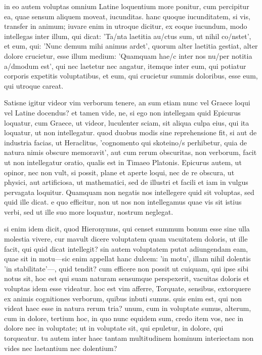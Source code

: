 in eo autem voluptas omnium Latine loquentium more ponitur, cum percipitur ea, quae sensum aliquem moveat, iucunditas. hanc quoque iucunditatem, si vis, transfer in animum; iuvare enim in utroque dicitur, ex eoque iucundum, modo intellegas inter illum, qui dicat: 'Ta/nta laetitia au/ctus sum, ut nihil co/nstet', et eum, qui: 'Nunc demum mihi animus ardet', quorum alter laetitia gestiat, alter dolore crucietur, esse illum medium: 'Quamquam hae/c inter nos nu/per notitia a/dmodum est', qui nec laetetur nec angatur, itemque inter eum, qui potiatur corporis expetitis voluptatibus, et eum, qui crucietur summis doloribus, esse eum, qui utroque careat.

 Satisne igitur videor vim verborum tenere, an sum etiam nunc vel Graece loqui vel Latine docendus? et tamen vide, ne, si ego non intellegam quid Epicurus loquatur, cum Graece, ut videor, luculenter sciam, sit aliqua culpa eius, qui ita loquatur, ut non intellegatur. quod duobus modis sine reprehensione fit, si aut de industria facias, ut Heraclitus, 'cognomento qui skoteino/s perhibetur, quia de natura nimis obscure memoravit', aut cum rerum obscuritas, non verborum, facit ut non intellegatur oratio, qualis est in Timaeo Platonis. Epicurus autem, ut opinor, nec non vult, si possit, plane et aperte loqui, nec de re obscura, ut physici, aut artificiosa, ut mathematici, sed de illustri et facili et iam in vulgus pervagata loquitur. Quamquam non negatis nos intellegere quid sit voluptas, sed quid ille dicat. e quo efficitur, non ut nos non intellegamus quae vis sit istius verbi, sed ut ille suo more loquatur, nostrum neglegat.

 si enim idem dicit, quod Hieronymus, qui censet summum bonum esse sine ulla molestia vivere, cur mavult dicere voluptatem quam vacuitatem doloris, ut ille facit, qui quid dicat intellegit? sin autem voluptatem putat adiungendam eam, quae sit in motu—sic enim appellat hanc dulcem: 'in motu', illam nihil dolentis 'in stabilitate'—, quid tendit? cum efficere non possit ut cuiquam, qui ipse sibi notus sit, hoc est qui suam naturam sensumque perspexerit, vacuitas doloris et voluptas idem esse videatur. hoc est vim afferre, Torquate, sensibus, extorquere ex animis cognitiones verborum, quibus inbuti sumus. quis enim est, qui non videat haec esse in natura rerum tria? unum, cum in voluptate sumus, alterum, cum in dolore, tertium hoc, in quo nunc equidem sum, credo item vos, nec in dolore nec in voluptate; ut in voluptate sit, qui epuletur, in dolore, qui torqueatur. tu autem inter haec tantam multitudinem hominum interiectam non vides nec laetantium nec dolentium?

